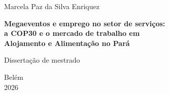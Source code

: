 \documentclass[12pt,a4paper]{report}
\begin{document}
\begin{titlepage}
\centering
\vspace*{2cm}
{\large Marcela Paz da Silva Enriquez\par}
\vspace{4cm}
{\LARGE\bfseries Megaeventos e emprego no setor de serviços:\\[6pt] a COP30 e o mercado de trabalho em\\[6pt] Alojamento e Alimentação no Pará\par}
\vspace{2cm}
{\large Dissertação de mestrado\par}
\vfill
{\large Belém\\ 2026\par}
\end{titlepage}

\tableofcontents










\appendix

\end{document}
